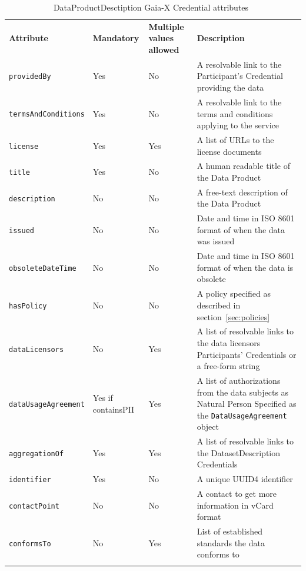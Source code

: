 \begin{longtable}{ |p{4cm}|p{2cm}|p{2cm}|p{7cm}| }
    \hhline{----}
    \textbf{Attribute} & \textbf{Mandatory} & \textbf{Multiple values allowed} & \textbf{Description}\\
    \hhline{----}
    \texttt{providedBy} & Yes & No & A resolvable link to the Participant's Credential providing the data\\
    \hhline{----}
    \texttt{termsAndConditions} & Yes & No & A resolvable link to the terms and conditions applying to the service\\
    \hhline{----}
    \texttt{license} & Yes & Yes & A list of URLs to the license documents\\
    \hhline{----}
    \texttt{title} & Yes & No & A human readable title of the Data Product\\
    \hhline{----}
    \texttt{description} & No & No & A free-text description of the Data Product\\
    \hhline{----}
    \texttt{issued} & No & No & Date and time in ISO 8601 format of when the data was issued\\
    \hhline{----}
    \texttt{obsoleteDateTime} & No & No & Date and time in ISO 8601 format of when the data is obsolete\\
    \hhline{----}
    \texttt{hasPolicy} & No & No & A policy specified as described in section~\ref{sec:policies}\\
    \hhline{----}
    \texttt{dataLicensors} & No & Yes & A list of resolvable links to the data licensors Participants' Credentials or a free-form string\\
    \hhline{----}
    \texttt{dataUsageAgreement} & Yes if containsPII & Yes & A list of authorizations from the data subjects as Natural Person
    Specified as the \texttt{DataUsageAgreement} object\\
    \hhline{----}
    \texttt{aggregationOf} & Yes & Yes & A list of resolvable links to the DatasetDescription Credentials\\
    \hhline{----}
    \texttt{identifier} & Yes & No & A unique UUID4 identifier\\
    \hhline{----}
    \texttt{contactPoint} & No & No & A contact to get more information in vCard format\\
    \hhline{----}
    \texttt{conformsTo} & No & Yes & List of established standards the data conforms to\\
    \hhline{----}
    \caption{DataProductDesctiption Gaia-X Credential attributes~\cite{gaiax_data_exchange_document}}
    \label{tab:data_product_description}
\end{longtable}

